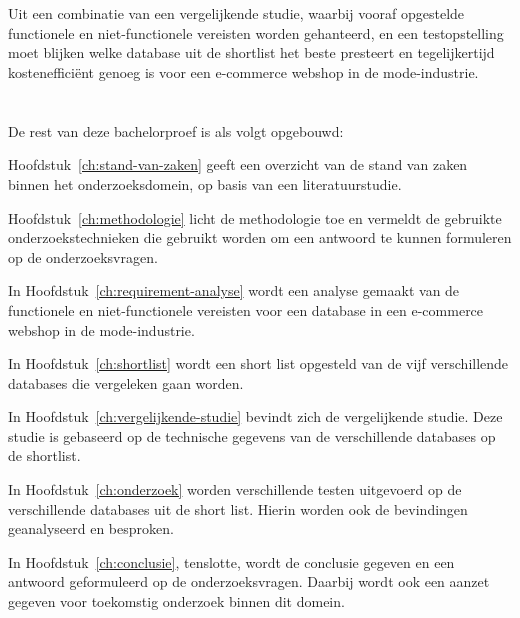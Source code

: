 \section{}%
\label{sec:onderzoeksdoelstelling}

Uit een combinatie van een vergelijkende studie, waarbij vooraf opgestelde functionele en niet-functionele vereisten worden gehanteerd, en een testopstelling moet blijken welke database uit de shortlist het beste presteert en tegelijkertijd kostenefficiënt genoeg is voor een e-commerce webshop in de mode-industrie.

\section{}%
\label{sec:opzet-bachelorproef}


De rest van deze bachelorproef is als volgt opgebouwd:

Hoofdstuk~\ref{ch:stand-van-zaken} geeft een overzicht van de stand van zaken binnen het onderzoeksdomein, op basis van een literatuurstudie.

Hoofdstuk~\ref{ch:methodologie} licht de methodologie toe en vermeldt de gebruikte onderzoekstechnieken die gebruikt worden om een antwoord te kunnen formuleren op de onderzoeksvragen.

In Hoofdstuk~\ref{ch:requirement-analyse} wordt een analyse gemaakt van de functionele en niet-functionele vereisten voor een database in een e-commerce webshop in de mode-industrie.

In Hoofdstuk~\ref{ch:shortlist} wordt een short list opgesteld van de vijf verschillende databases die vergeleken gaan worden.

In Hoofdstuk~\ref{ch:vergelijkende-studie} bevindt zich de vergelijkende studie. Deze studie is gebaseerd op de technische gegevens van de verschillende databases op de shortlist.

In Hoofdstuk~\ref{ch:onderzoek} worden verschillende testen uitgevoerd op de verschillende databases uit de short list. Hierin worden ook de bevindingen geanalyseerd en besproken.

In Hoofdstuk~\ref{ch:conclusie}, tenslotte, wordt de conclusie gegeven en een antwoord geformuleerd op de onderzoeksvragen. Daarbij wordt ook een aanzet gegeven voor toekomstig onderzoek binnen dit domein.